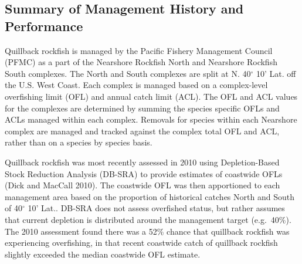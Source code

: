 \documentclass[11pt,
  english,
  a4paper,
]{article}
\begin{document}
\leavevmode\tagmcend\tagstructend\par


\hypertarget{summary-of-management-history-and-performance}{%
\subsection{Summary of Management History and Performance}\label{summary-of-management-history-and-performance}}

\leavevmode\tagmcend\tagstructend


Quillback rockfish is managed by the Pacific Fishery Management Council (PFMC) as a part of the Nearshore Rockfish North and Nearshore Rockfish South complexes. The North and South complexes are split at N. 40{\(^\circ\)\leavevmode\tagmcend\tagstructend} 10' Lat. off the U.S. West Coast. Each complex is managed based on a complex-level overfishing limit (OFL) and annual catch limit (ACL). The OFL and ACL values for the complexes are determined by summing the species specific OFLs and ACLs managed within each complex. Removals for species within each Nearshore complex are managed and tracked against the complex total OFL and ACL, rather than on a species by species basis.

\leavevmode\tagmcend\tagstructend\par


Quillback rockfish was most recently assessed in 2010 using Depletion-Based Stock Reduction Analysis (DB-SRA) to provide estimates of coastwide OFLs {(Dick and MacCall 2010)\leavevmode\tagmcend\tagstructend}. The coastwide OFL was then apportioned to each management area based on the proportion of historical catches North and South of 40{\(^\circ\)\leavevmode\tagmcend\tagstructend} 10' Lat.. DB-SRA does not assess overfished status, but rather assumes that current depletion is distributed around the management target (e.g.~40\%). The 2010 assessment found there was a 52\% chance that quillback rockfish was experiencing overfishing, in that recent coastwide catch of quillback rockfish slightly exceeded the median coastwide OFL estimate.
\end{document}

